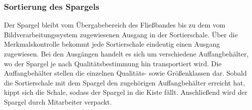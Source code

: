 \documentclass{ezb}
\begin{document}
\subsubsection*{Sortierung des Spargels}
Der Spargel bleibt vom Übergabebereich des Fließbandes bis zu dem vom Bildverarbeitungssystem zugewiesenen Ausgang in der Sortierschale. Über die Merkmalskontrolle bekommt jede Sortierschale eindeutig einen Ausgang zugewiesen. Bei den Ausgängen handelt es sich um verschiedene Auffangbehälter, wo der Spargel je nach Qualitätsbestimmung
hin transportiert wird. Die Auffangbehälter stellen die einzelnen Qualitäts- sowie Größenklassen dar. 
Sobald die Sortierschale mit dem Spargel den zugehörigen Auffangbehälter erreicht
hat, kippt sich die Schale, sodass der Spargel in die Kiste fällt. 
Anschließend wird der Spargel durch Mitarbeiter verpackt.

\newpage
\end{document}
